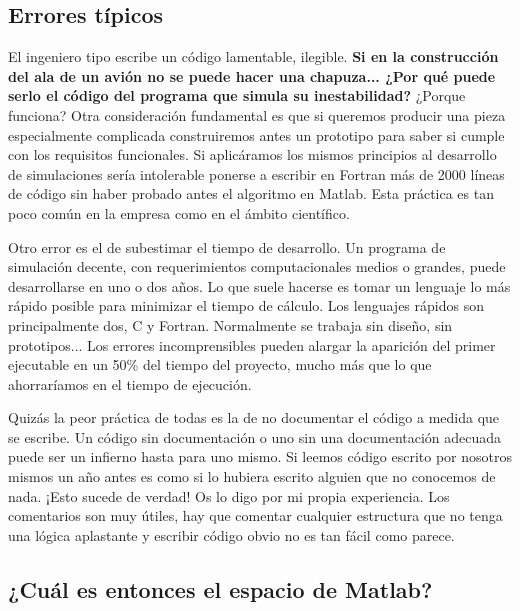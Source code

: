 \subsection{Errores típicos}

El ingeniero tipo escribe un código lamentable, ilegible.
\textbf{Si en la construcción del ala de un
avión no se puede hacer una chapuza... ¿Por qué puede serlo el código
del programa que simula su inestabilidad?} ¿Porque funciona? Otra
consideración fundamental es que si queremos producir una pieza
especialmente complicada construiremos antes un prototipo para saber
si cumple con los requisitos funcionales.  Si aplicáramos los mismos
principios al desarrollo de simulaciones sería intolerable ponerse a
escribir en Fortran más de 2000 líneas de código sin haber probado
antes el algoritmo en Matlab. Esta práctica es tan poco común en la
empresa como en el ámbito científico.

Otro error es el de subestimar el tiempo de desarrollo. Un programa de
simulación decente, con requerimientos computacionales medios o
grandes, puede desarrollarse en uno o dos años. Lo que suele hacerse
es tomar un lenguaje lo más rápido posible para minimizar el tiempo de
cálculo. Los lenguajes rápidos son principalmente dos, C y Fortran.
Normalmente se trabaja sin diseño, sin prototipos... Los errores
incomprensibles pueden alargar la aparición del primer ejecutable en
un 50\% del tiempo del proyecto, mucho más que lo que ahorraríamos en
el tiempo de ejecución.

Quizás la peor práctica de todas es la de no documentar el código a
medida que se escribe. Un código sin documentación o uno sin una
documentación adecuada puede ser un infierno hasta para uno mismo.  Si
leemos código escrito por nosotros mismos un año antes es como si lo
hubiera escrito alguien que no conocemos de nada. ¡Esto sucede de
verdad! Os lo digo por mi propia experiencia. Los comentarios son muy
útiles, hay que comentar cualquier estructura que no tenga una lógica
aplastante y escribir código obvio no es tan fácil como parece.


\subsection{¿Cuál es entonces el espacio de Matlab?}

